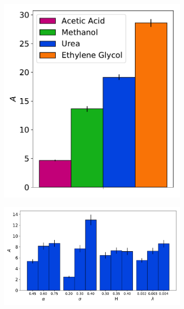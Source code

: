 \documentclass[aps,pre,preprint,groupedaddress,longbibliography]{revtex4-2}
\begin{document}
\begin{figure}
\begin{subfigure}{0.31\textwidth}
  \includegraphics[width=\textwidth]{c_parameter_comparison.pdf}
  \caption{}\label{fig:c_parameters}
  \end{subfigure}
  \begin{subfigure}{0.66\textwidth}
  \includegraphics[width=\textwidth]{c_influence.pdf}
  \caption{}\label{fig:c_influence}
  \end{subfigure}
  \vspace{-.5cm}

\end{figure}
\end{document}
